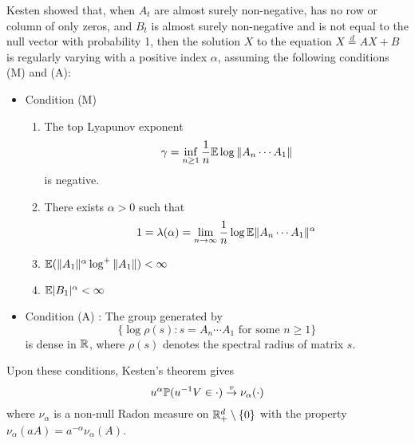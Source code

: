Kesten \cite{kesten:1973} showed that, when $A_t$ are almost
surely non-negative, has no row or column of only zeros, and
$B_t$ is almost surely non-negative and is not equal to the null
vector with probability 1, then the solution $X$ to the equation
$X \overset{d}{=} A X + B$ is regularly varying with a positive index
$\alpha$, assuming the following conditions (M) and (A):
\begin{itemize}
\item Condition (M)
  \begin{enumerate}
  \item The top Lyapunov exponent
    \[
    \gamma = \inf_{n \geq 1} {1 \over n}\mathbb{E} \log \|A_n \cdots A_1\|
    \]
    is negative.
  \item There exists $\alpha > 0$ such that
    \[
    1 = \lambda(\alpha) = \lim_{n \to \infty} {1 \over n} \log \mathbb{E} \|A_n \cdots A_1\|^\alpha
    \]
  \item $\mathbb{E} (\|A_1\|^\alpha \log^+\|A_1\|) < \infty$
  \item $\mathbb{E} |B_1|^\alpha < \infty$
  \end{enumerate}
\item Condition (A) : The group generated by
  \[
  \{\log\rho(s): s = A_n \cdots A_1 \text{ for some } n \geq 1\}
  \]
  is dense in $\mathbb R$, where $\rho(s)$ denotes the spectral
  radius of matrix $s$.
\end{itemize}
Upon these conditions, Kesten's theorem gives
\begin{equation}
  \label{eq:jorg}
  u^\alpha \P(u^{-1} V \in \cdot) \overset{v}{\to} \nu_\alpha(\cdot)
\end{equation}
where $\nu_\alpha$ is a non-null Radon measure on
$\mathbb R^d_+ \setminus \{0\}$ with the property
$\nu_\alpha(a A) = a^{-\alpha} \nu_\alpha(A)$.

